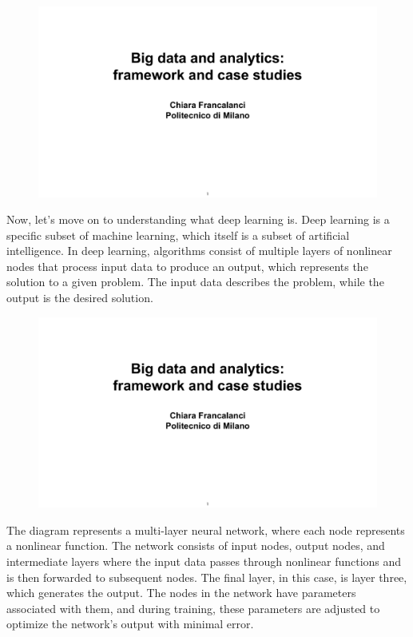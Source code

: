 \begin{figure}[!h]
  \centering
  \includegraphics[page=8, trim = 1.5cm 5.5cm 1.5cm 4cm, clip, width=\imagewidth]{images/06 - BIG_DATA.pdf}
\end{figure}

Now, let's move on to understanding what deep learning is. Deep learning
is a specific subset of machine learning, which itself is a subset of
artificial intelligence. In deep learning, algorithms consist of
multiple layers of nonlinear nodes that process input data to produce an
output, which represents the solution to a given problem. The input data
describes the problem, while the output is the desired solution.

\begin{figure}[!h]
  \centering
  \includegraphics[page=9, trim = 1.5cm 2cm 1.5cm 4cm, clip, width=\imagewidth]{images/06 - BIG_DATA.pdf}
\end{figure}

The diagram represents a multi-layer neural network, where each node
represents a nonlinear function. The network consists of input nodes,
output nodes, and intermediate layers where the input data passes
through nonlinear functions and is then forwarded to subsequent nodes.
The final layer, in this case, is layer three, which generates the
output. The nodes in the network have parameters associated with them,
and during training, these parameters are adjusted to optimize the
network's output with minimal error.

